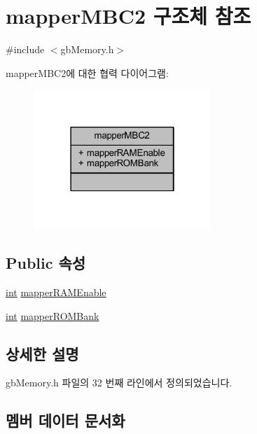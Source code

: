 \hypertarget{structmapper_m_b_c2}{}\section{mapper\+M\+B\+C2 구조체 참조}
\label{structmapper_m_b_c2}


{\ttfamily \#include $<$gb\+Memory.\+h$>$}



mapper\+M\+B\+C2에 대한 협력 다이어그램\+:\nopagebreak
\begin{figure}[H]
\begin{center}
\leavevmode
\includegraphics[width=190pt]{structmapper_m_b_c2__coll__graph}
\end{center}
\end{figure}
\subsection*{Public 속성}
\begin{DoxyCompactItemize}
\item 
\mbox{\hyperlink{_util_8cpp_a0ef32aa8672df19503a49fab2d0c8071}{int}} \mbox{\hyperlink{structmapper_m_b_c2_ab3d0eb8c729491ca26f62d4f70b335ac}{mapper\+R\+A\+M\+Enable}}
\item 
\mbox{\hyperlink{_util_8cpp_a0ef32aa8672df19503a49fab2d0c8071}{int}} \mbox{\hyperlink{structmapper_m_b_c2_a608aebcc4a8b623a2feac2f78dbeb3c8}{mapper\+R\+O\+M\+Bank}}
\end{DoxyCompactItemize}


\subsection{상세한 설명}


gb\+Memory.\+h 파일의 32 번째 라인에서 정의되었습니다.



\subsection{멤버 데이터 문서화}
\mbox{\label{structmapper_m_b_c2_ab3d0eb8c729491ca26f62d4f70b335ac}} 
